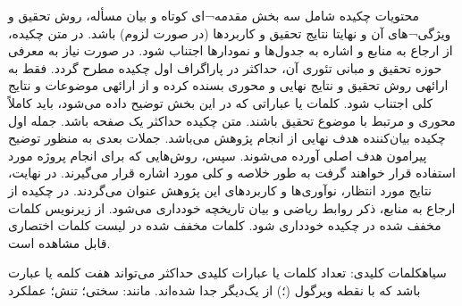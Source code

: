 \begin{ParsaAbstractParsi}
    محتویات چکیده شامل سه بخش مقدمه¬ای کوتاه و بیان مسأله، روش تحقیق و ویژگی¬های آن و نهایتا نتایج تحقیق و کاربردها (در صورت لزوم) باشد. در متن چکیده، از ارجاع به منابع و اشاره به جدول‌ها و نمودارها اجتناب شود. در صورت نیاز به معرفی حوزه تحقیق و مبانی تئوری آن، حداکثر در پاراگراف اول چکیده مطرح گردد. فقط به ارائهی روش تحقیق و نتایج نهایی و محوری بسنده کرده و از ارائهی موضوعات و نتایج كلی اجتناب شود. كلمات یا عباراتی كه در این بخش توضیح داده می‌شود، باید كاملاً محوری و مرتبط با موضوع تحقیق باشند. متن چکیده حداکثر یک صفحه باشد. جمله اول چکیده بیان‌کننده هدف نهایی از انجام پژوهش می‌باشد. جملات بعدی به منظور توضیح پیرامون هدف اصلی آورده می‌شوند. سپس، روش‌هایی که برای انجام پروژه مورد استفاده قرار خواهند گرفت به طور خلاصه و کلی مورد اشاره قرار می‌گیرند. در نهایت، نتایج مورد انتظار، نوآوری‌ها و کاربردهای این پژوهش عنوان می‌گردند. در چكیده از ارجاع به منابع، ذكر روابط ریاضی و بیان تاریخچه خودداری ‌می‌شود.
    از زیرنویس کلمات مخفف شده در چکیده خودداری شود. کلمات مخفف شده در لیست کلمات اختصاری قابل مشاهده است.


    \bigskip\noindent
    ‌سیاه{کلمات کلیدی:} تعداد كلمات یا عبارات كلیدی حداكثر می‌تواند هفت كلمه یا عبارت باشد که با نقطه ویرگول (؛) از یک‌دیگر جدا شده‌اند. مانند: سختی؛ تنش؛ عملکرد
\end{ParsaAbstractParsi}
\clearpage